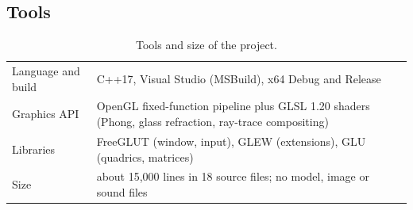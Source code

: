 \documentclass[10pt,a4paper]{article}
\begin{document}
\subsection{Tools}
\begin{table}[htbp]
\centering\small
\begin{tabular}{@{}p{3.3cm}p{12.6cm}@{}}
\toprule
Language and build & C++17, Visual Studio (MSBuild), x64 Debug and Release\\
Graphics API & OpenGL fixed-function pipeline plus GLSL 1.20 shaders (Phong, glass refraction, ray-trace compositing)\\
Libraries & FreeGLUT (window, input), GLEW (extensions), GLU (quadrics, matrices)\\
Size & about 15,000 lines in 18 source files; no model, image or sound files\\
\bottomrule
\end{tabular}
\caption{Tools and size of the project.}
\end{table}
\end{document}
